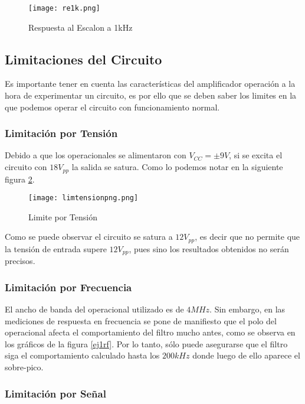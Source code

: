 \begin{figure}[H]
    \centering
    \texttt{[image: re1k.png]}
    \caption{Respuesta al Escalon a 1kHz}
    \label{ej1re1k}
\end{figure}

\subsection{Limitaciones del Circuito}

Es importante tener en cuenta las características del amplificador operación a la hora de experimentar un circuito, es por ello que se deben saber los limites en la que podemos operar el circuito con funcionamiento normal. 

\subsubsection{Limitación por Tensión}

Debido a que los operacionales se alimentaron con $V_{CC} = \pm 9V$, si se excita el circuito con $18V_{pp}$ la salida se satura. Como lo podemos notar en la siguiente figura \ref{ej1limt}.

\begin{figure}[H]
    \centering
    \texttt{[image: limtensionpng.png]}
    \caption{Limite por Tensión}
    \label{ej1limt}
\end{figure}

Como se puede observar el circuito se satura a $12V_{pp}$, es decir que no permite que la tensión de entrada supere $12V_{pp}$, pues sino los resultados obtenidos no serán precisos.

\subsubsection{Limitación por Frecuencia}

El ancho de banda del operacional utilizado es de $4MHz$. Sin embargo, en las mediciones de respuesta en frecuencia se pone de manifiesto que el polo del operacional afecta el comportamiento del filtro mucho antes, como se observa en los gr\'aficos de la figura \ref{ej1rf}. Por lo tanto, s\'olo puede asegurarse que el filtro siga el comportamiento calculado hasta los $200kHz$ donde luego de ello aparece el sobre-pico.

\subsubsection{Limitación por Señal}


